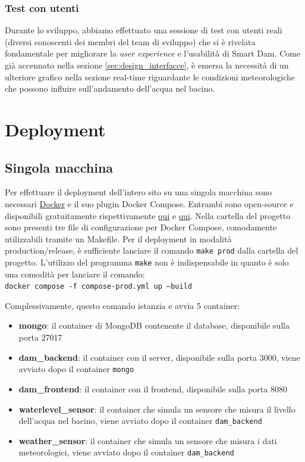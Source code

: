\documentclass[a4paper,12pt]{report}
\newcommand{\docker}{\href{https://www.docker.com/}{Docker} }
\begin{document}
\subsection{Test con utenti}
Durante lo sviluppo, abbiamo effettuato una sessione di test con utenti reali (diversi conoscenti dei membri del team di sviluppo) che si è rivelata fondamentale per migliorare la \emph{user experience} e l'usabilità di Smart Dam. Come già accennato nella sezione \ref{sec:design_interfacce}, è emersa la necessità di un ulteriore grafico nella sezione real-time riguardante le condizioni meteorologiche che possono influire sull'andamento dell'acqua nel bacino.

\clearpage
\chapter{Deployment}\label{sec:deployment}

\section{Singola macchina}
Per effettuare il deployment dell'intero sito su una singola macchina sono necessari \docker e il suo plugin Docker Compose. Entrambi sono open-source e disponibili gratuitamente rispettivamente \href{https://docs.docker.com/desktop/#download-and-install}{qui} e \href{https://docs.docker.com/compose/install/}{qui}. Nella cartella del progetto sono presenti tre file di configurazione per Docker Compose, comodamente utilizzabili tramite un Makefile. Per il deployment in modalità production/release, è sufficiente lanciare il comando \texttt{make prod} dalla cartella del progetto. L'utilizzo del programma \texttt{make} non è indispensabile in quanto è solo una comodità per lanciare il comando:\\
\texttt{docker compose -f compose-prod.yml up --build}

Complessivamente, questo comando istanzia e avvia 5 container:
\begin{itemize}
    \item \textbf{mongo}: il container di MongoDB contenente il database, disponibile sulla porta 27017
    \item \textbf{dam\_backend}: il container con il server, disponibile sulla porta 3000, viene avviato dopo il container \texttt{mongo}
    \item \textbf{dam\_frontend}: il container con il frontend, disponibile sulla porta 8080
    \item \textbf{waterlevel\_sensor}: il container che simula un sensore che misura il livello dell'acqua nel bacino, viene avviato dopo il container \texttt{dam\_backend}
    \item \textbf{weather\_sensor}: il container che simula un sensore che misura i dati meteorologici, viene avviato dopo il container \texttt{dam\_backend}
\end{itemize}
\end{document}
